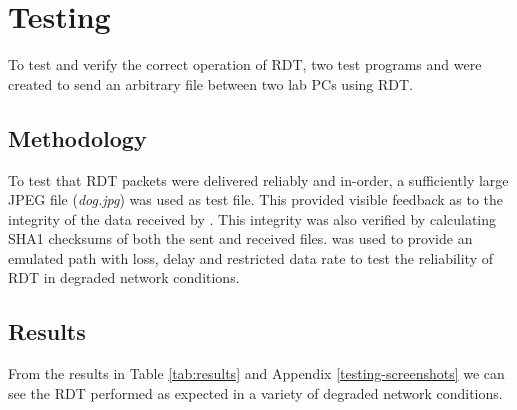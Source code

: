 \section{Testing}

To test and verify the correct operation of RDT, two test programs  and  were created to send an arbitrary file between two lab PCs using RDT. 

\subsection{Methodology}

To test that RDT packets were delivered reliably and in-order, a sufficiently large JPEG file (\emph{dog.jpg}) was used as test file. This provided visible feedback as to the integrity of the data received by . This integrity was also verified by calculating SHA1 checksums of both the sent and received files.  was used to provide an emulated path with loss, delay and restricted data rate to test the reliability of RDT in degraded network conditions.

\subsection{Results}

From the results in Table \ref{tab:results} and Appendix \ref{testing-screenshots} we can see the RDT performed as expected in a variety of degraded network conditions. 

